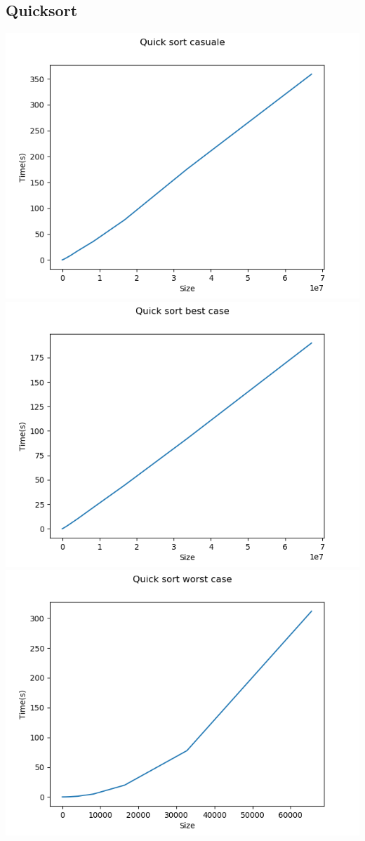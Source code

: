\documentclass[]{article}
\begin{document}
\subsection{Quicksort}
\includegraphics[scale=0.8]{QuickSortCasuale}\\
\includegraphics[scale=0.8]{QuickSortBestCase}\\
\includegraphics[scale=0.8]{QuickSortWorstCase}\\
\end{document}
